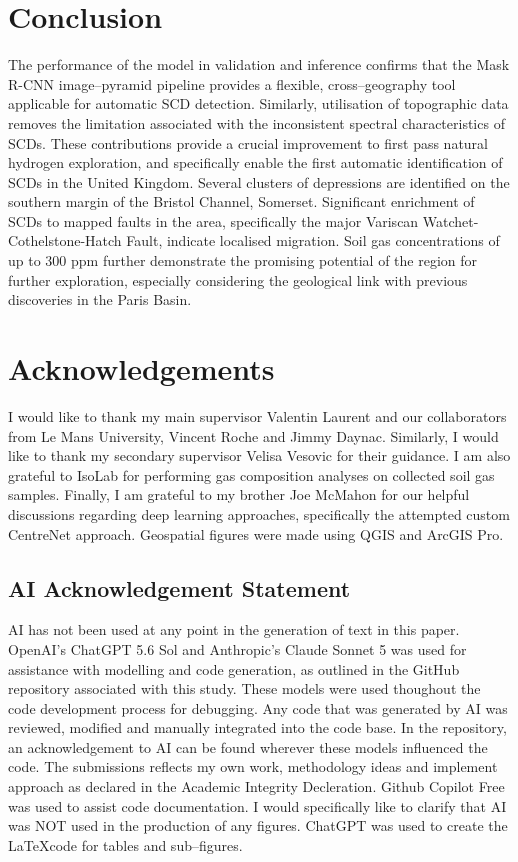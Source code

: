 \documentclass[12pt]{article}
\begin{document}
\section{Conclusion}

The performance of the model in validation and inference confirms that the Mask R-CNN image--pyramid pipeline provides a flexible, cross--geography tool applicable for automatic SCD detection. Similarly, utilisation of topographic data removes the limitation associated with the inconsistent spectral characteristics of SCDs. These contributions provide a crucial improvement to first pass natural hydrogen exploration, and specifically enable the first automatic identification of SCDs in the United Kingdom. Several clusters of depressions are identified on the southern margin of the Bristol Channel, Somerset. Significant enrichment of SCDs to mapped faults in the area, specifically the major Variscan Watchet-Cothelstone-Hatch Fault, indicate localised  migration. Soil gas concentrations of up to 300 ppm further demonstrate the promising potential of the region for further  exploration, especially considering the geological link with previous discoveries in the Paris Basin.

\section*{Acknowledgements}

I would like to thank my main supervisor Valentin Laurent and our collaborators from Le Mans University, Vincent Roche and Jimmy Daynac. Similarly, I would like to thank my secondary supervisor Velisa Vesovic for their guidance. I am also grateful to IsoLab for performing gas composition analyses on collected soil gas samples. Finally, I am grateful to my brother Joe McMahon for our helpful discussions regarding deep learning approaches, specifically the attempted custom CentreNet approach. Geospatial figures were made using QGIS and ArcGIS Pro.

\subsection*{AI Acknowledgement Statement}

AI has not been used at any point in the generation of text in this paper. OpenAI's ChatGPT 5.6 Sol and Anthropic's Claude Sonnet 5 was used for assistance with modelling and code generation, as outlined in the GitHub repository associated with this study. These models were used thoughout the code development process for debugging. Any code that was generated by AI was reviewed, modified and manually integrated into the code base. In the repository, an acknowledgement to AI can be found wherever these models influenced the code. The submissions reflects my own work, methodology ideas and implement approach as declared in the Academic Integrity Decleration. Github Copilot Free was used to assist code documentation. I would specifically like to clarify that AI was NOT used in the production of any figures. ChatGPT was used to create the \LaTeX code for tables and sub--figures.

\printbibliography
\end{document}
